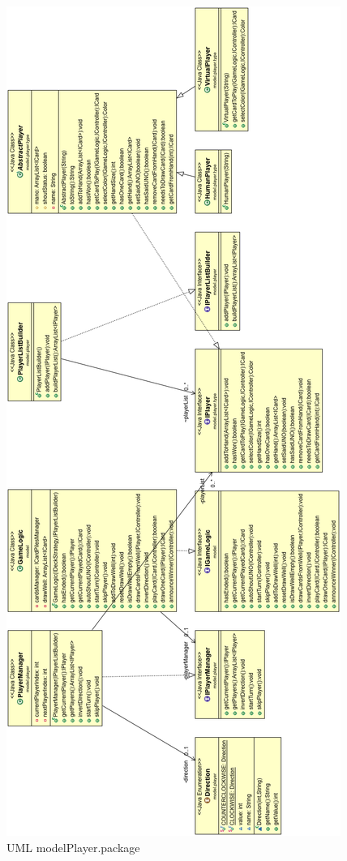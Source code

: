 \documentclass[letterpaper,11pt]{article}
\begin{document}
\begin{figure}[H]
\center
\includegraphics[scale=0.3]{modelPlayer.png}
\caption{UML modelPlayer.package}
\end{figure}
\end{document}
